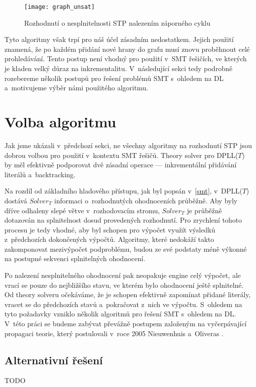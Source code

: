 \begin{figure}
	\centering
	\texttt{[image: graph\_unsat]}
	\caption{Rozhodnutí o nesplnitelnosti STP nalezením záporného cyklu}
\end{figure}

Tyto algoritmy však trpí pro náš účel zásadním nedostatkem. Jejich použití znamená, že po každém přidání nové hrany do grafu musí znovu proběhnout celé prohledávání. Tento postup není vhodný pro použití v~SMT řešičích, ve kterých je kladen velký důraz na inkrementalitu. V~následující sekci tedy podrobně rozebereme několik postupů pro řešení problémů SMT s~ohledem na DL a~motivujeme výběr námi použitého algoritmu. 

\section{Volba algoritmu}\label{alg}

Jak jsme ukázali v~předchozí sekci, ne všechny algoritmy na rozhodnutí STP jsou dobrou volbou pro použití v~kontextu SMT řešičů. Theory solver pro DPLL($T$) by měl efektivně podporovat dvě zásadní operace --- inkrementální přidávání literálů a~backtracking.

Na rozdíl od základního hladového přístupu, jak byl popsán v~\ref{smt}, v~DPLL($T$) dostává $Solver_T$ informaci o~rozhodnutých ohodnoceních průběžně. Aby byly dříve odhaleny slepé větve v~rozhodovacím stromu, $Solver_T$ je průběžně dotazován na splnitelnost dosud provedených rozhodnutí. Pro zrychlení tohoto procesu je tedy vhodné, aby byl schopen pro výpočet využít výsledků z~předchozích dokončených výpočtů. Algoritmy, které nedokáží takto zakomponovat mezivýpočet podproblému, budou ze své podstaty méně výkonné na postupné sekvenci splnitelných ohodnocení.

Po nalezení nesplnitelného ohodnocení pak neopakuje engine celý výpočet, ale vrací se pouze do nejbližšího stavu, ve kterém bylo ohodnocení ještě splnitelné. Od theory solveru očekáváme, že je schopen efektivně zapomínat přidané literály, vracet se do předchozích stavů a~pokračovat z~nich ve výpočtu. %
S~ohledem na tyto požadavky vzniklo několik algoritmů pro řešení SMT s~ohledem na DL. V~této práci se budeme zabývat převážně postupem založeným na vyčerpávající propagaci teorie, který postulovali v~roce 2005 Nieuwenhuis a~Oliveras \cite{Nieuwenhuis05}.

\subsection{Alternativní řešení}

TODO

